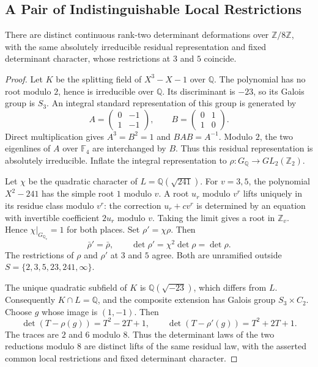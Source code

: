 \subsection{A Pair of Indistinguishable Local Restrictions}

\begin{proposition}
\label{v4-arith:bcglue-core:prop:two-prime-nonuniqueness}
There are distinct continuous rank-two determinant deformations over
$\mathbb Z/8\mathbb Z$, with the same absolutely irreducible
residual representation and fixed determinant character, whose
restrictions at $3$ and $5$ coincide.
\end{proposition}

\begin{proof}
Let $K$ be the splitting field of $X^3-X-1$ over $\mathbb Q$.
The polynomial has no root modulo $2$, hence is irreducible over
$\mathbb Q$. Its discriminant is $-23$, so its Galois group is
$S_3$. An integral standard representation of this group is generated
by
\[
 A=\begin{pmatrix}0&-1\\1&-1\end{pmatrix},\qquad
 B=\begin{pmatrix}0&1\\1&0\end{pmatrix}.
\]
Direct multiplication gives $A^3=B^2=1$ and $BAB=A^{-1}$.
Modulo $2$, the two eigenlines of $A$ over $\mathbb F_4$ are
interchanged by $B$. Thus this residual representation is absolutely
irreducible. Inflate the integral representation to
$\rho:G_{\mathbb Q}\to GL_2(\mathbb Z_2)$.

Let $\chi$ be the quadratic character of
$L=\mathbb Q(\sqrt{241})$.
For $v=3,5$, the polynomial $X^2-241$ has the simple root $1$
modulo $v$. A root $u_r$ modulo $v^r$ lifts uniquely in its residue
class modulo $v^r$: the correction $u_r+c v^r$ is determined by
an equation with invertible coefficient $2u_r$ modulo $v$.
Taking the limit gives a root in $\mathbb Z_v$.
Hence $\chi|_{G_{\mathbb Q_v}}=1$ for both places.
Set $\rho'=\chi\rho$. Then
\[
 \bar\rho'=\bar\rho,\qquad
 \det\rho'=\chi^2\det\rho=\det\rho.
\]
The restrictions of $\rho$ and $\rho'$ at $3$ and $5$ agree.
Both are unramified outside
$S=\{2,3,5,23,241,\infty\}$.

The unique quadratic subfield of $K$ is $\mathbb Q(\sqrt{-23})$,
which differs from $L$. Consequently $K\cap L=\mathbb Q$, and
the composite extension has Galois group $S_3\times C_2$.
Choose $g$ whose image is $(1,-1)$. Then
\[
 \det(T-\rho(g))=T^2-2T+1,\qquad
 \det(T-\rho'(g))=T^2+2T+1.
\]
The traces are $2$ and $6$ modulo $8$.
Thus the determinant laws of the two reductions modulo $8$ are
distinct lifts of the same residual law, with the asserted common
local restrictions and fixed determinant character.
\end{proof}

